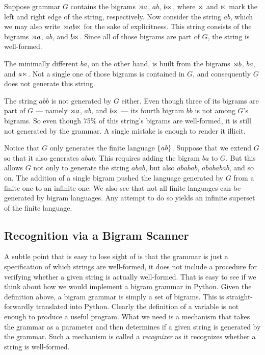 \begin{examplebox}
    \label{ex:SL_BigramGrammar}%
    Suppose grammar $G$ contains the bigrams $\rtimes a$, $\mathit{ab}$, $b \ltimes$, where $\rtimes$ and $\ltimes$ mark the left and right edge of the string, respectively.
    Now consider the string $\mathit{ab}$, which we may also write $\rtimes \mathit{ab} \ltimes$ for the sake of explicitness.
    This string consists of the bigrams $\rtimes a$, $\mathit{ab}$, and $b \ltimes$.
    Since all of those bigrams are part of $G$, the string is well-formed. 

    The minimally different $\mathit{ba}$, on the other hand, is built from the bigrams $\rtimes b$, $\mathit{ba}$, and $\mathit{a \ltimes}$.
    Not a single one of those bigrams is contained in $G$, and consequently $G$ does not generate this string.

    The string $\mathit{abb}$ is not generated by $G$ either.
    Even though three of its bigrams are part of $G$ --- namely $\rtimes a$, $\mathit{ab}$, and $b \ltimes$ --- its fourth bigram $\mathit{bb}$ is not among $G$'s bigrams.
    So even though 75\% of this string's bigrams are well-formed, it is still not generated by the grammar.
    A single mistake is enough to render it illicit.

    Notice that $G$ only generates the finite language $\left \{ \mathit{ab} \right \}$.
    Suppose that we extend $G$ so that it also generates $\mathit{abab}$.
    This requires adding the bigram $\mathit{ba}$ to $G$.
    But this allows $G$ not only to generate the string $\mathit{abab}$, but also $\mathit{ababab}$, $\mathit{abababab}$, and so on.
    The addition of a single bigram pushed the language generated by $G$ from a finite one to an infinite one.
    We also see that not all finite languages can be generated by bigram languages.
    Any attempt to do so yields an infinite superset of the finite language.
\end{examplebox}

\subsection{Recognition via a Bigram Scanner}
A subtle point that is easy to lose sight of is that the grammar is just a specification of which strings are well-formed, it does not include a procedure for verifying whether a given string is actually well-formed.
That is easy to see if we think about how we would implement a bigram grammar in Python.
Given the definition above, a bigram grammar is simply a set of bigrams.
This is straight-forwardly translated into Python.
%
%
Clearly the definition of a variable is not enough to produce a useful program.
What we need is a mechanism that takes the grammar as a parameter and then determines if a given string is generated by the grammar.
Such a mechanism is called a \emph{recognizer} as it recognizes whether a string is well-formed.

